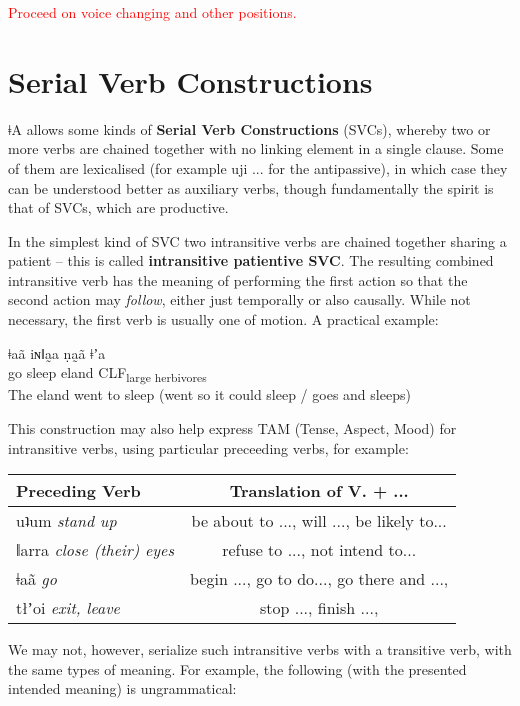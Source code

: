 \documentclass[11pt,a5paper]{book}
\newcommand{\qcn}[1]{\textcolor{AccentText}{\large#1}}
\newcommand{\langname}{\qcn{ǂA}}
\newcommand{\transl}[2]{\qcn{#1} \emph{#2}}
\newcommand{\grammsc}[1]{\textsc{#1}}
\newcommand{\CLF}[1]{\grammsc{CLF}\textsubscript{#1}}
\newcommand{\cmnt}[1]{\textcolor{red}{#1}}
\begin{document}
\cmnt{Proceed on voice changing and other positions.}

\section{Serial Verb Constructions}

\langname{} allows some kinds of \textbf{Serial Verb Constructions} (SVCs), whereby two or more verbs are chained together with no linking element in a single clause. Some of them are lexicalised (for example \qcn{uji ...} for the antipassive), in which case they can be understood better as auxiliary verbs, though fundamentally the spirit is that of SVCs, which are productive.

In the simplest kind of SVC two intransitive verbs are chained together sharing a patient -- this is called \textbf{intransitive patientive SVC}. The resulting combined intransitive verb has the meaning of performing the first action so that the second action may \emph{follow}, either just temporally or also causally. While not necessary, the first verb is usually one of motion. A practical example:

\begin{exe}
\ex
\gll ǂaã iɴǁa̰a ṇa̰ã ǂʼa \\
go sleep eland \CLF{large herbivores}\\
\glt The eland went to sleep (went so it could sleep / goes and sleeps)
\end{exe}

This construction may also help express TAM (Tense, Aspect, Mood) for intransitive verbs, using particular preceeding verbs, for example:

\begin{center}
\begin{tabular}{|l|c|}
\hline
Preceding Verb  & Translation of V. + ...\\ \hline\hline
 \transl{uʇum}{stand up} & be about to ..., will ..., be likely to...\\ \hline
\transl{ǁarra}{close (their) eyes} & refuse to ..., not intend to...\\ \hline
\transl{ǂaã}{go} & begin ..., go to do..., go there and ..., \\ \hline
\transl{tłʼoi}{exit, leave} & stop ..., finish ..., \\ \hline
\end{tabular}
\end{center}

We may not, however, serialize such intransitive verbs with a transitive verb, with the same types of meaning. For example, the following (with the presented intended meaning) is ungrammatical:
\end{document}
